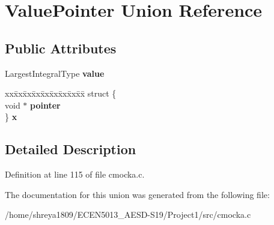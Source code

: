 \hypertarget{unionValuePointer}{}\section{Value\+Pointer Union Reference}
\label{unionValuePointer}
\subsection*{Public Attributes}
\begin{DoxyCompactItemize}
\item 
\mbox{\label{unionValuePointer_ad8994d8ea772e4033e1017ecb7b7b251}} 
Largest\+Integral\+Type {\bfseries value}
\item 
\mbox{\label{unionValuePointer_a088c1a29a21d4bb2d6529c63fb08dff3}} 
\begin{tabbing}
xx\=xx\=xx\=xx\=xx\=xx\=xx\=xx\=xx\=\kill
struct \{\\
\>void $\ast$ {\bfseries pointer}\\
\} {\bfseries x}\\

\end{tabbing}\end{DoxyCompactItemize}


\subsection{Detailed Description}


Definition at line 115 of file cmocka.\+c.



The documentation for this union was generated from the following file\+:\begin{DoxyCompactItemize}
\item 
/home/shreya1809/\+E\+C\+E\+N5013\+\_\+\+A\+E\+S\+D-\/\+S19/\+Project1/src/cmocka.\+c\end{DoxyCompactItemize}
